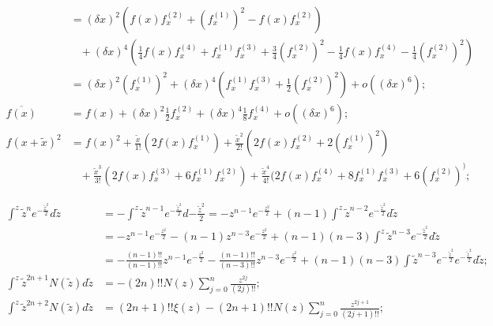 \documentclass[twoside]{article}
\numberwithin{equation}{section}
\newcommand{\eqspace}{\;\;\;}
\begin{document}
\begin{align*}
  &= (\delta x)^2 (f(x) f^{(2)}_x + (f^{(1)}_x)^2 - f(x) f^{(2)}_x) \\
  &\eqspace + (\delta x)^4 (\frac{1}{4} f(x) f^{(4)}_x + f^{(1)}_x f^{(3)}_x + \frac{3}{4} (f^{(2)}_x)^2 - \frac{1}{4} f(x) f^{(4)}_x - \frac{1}{4} (f^{(2)}_x)^2)    \\
  & = (\delta x)^2 (f^{(1)}_x)^2 + (\delta x)^4 (f^{(1)}_x f^{(3)}_x + \frac{1}{2} (f^{(2)}_x)^2) + o((\delta x)^6);  \\
\overline{f(x)} &= f(x) + (\delta x)^2 \frac{1}{2} f^{(2)}_x + (\delta x)^4 \frac{1}{8} f^{(4)}_x + o((\delta x)^6); \\
f(x + \tilde{x})^2 &= f(x)^2 + \frac{\tilde{x}}{1!} (2 f(x) f^{(1)}_x) + \frac{\tilde{x}^2}{2!} (2 f(x) f^{(2)}_x + 2 (f^{(1)}_x)^2) \\
&\eqspace + \frac{\tilde{x}^3}{3!} (2 f(x) f^{(3)}_x + 6 f^{(1)}_x f^{(2)}_x) 
     + \frac{\tilde{x}^4}{4!} (2 f(x) f^{(4)}_x + 8 f^{(1)}_x f^{(3)}_x + 6 (f^{(2)}_x)^);
\end{align*}


\begin{align*}
\int^z \tilde{z}^{n} e^{-\frac{\tilde{z}^2}{2}} d \tilde{z} &= -\int^z \tilde{z}^{n - 1} e^{-\frac{\tilde{z}^2}{2}} d {-\frac{\tilde{z}^2}{2}}
  = - z^{n-1} e^{-\frac{z^2}{2}} + (n-1) \int^z \tilde{z}^{n-2} e^{-\frac{\tilde{z}^2}{2}} d \tilde{z} \\
 &= - z^{n-1} e^{-\frac{z^2}{2}} - (n-1) z^{n-3} e^{-\frac{z^2}{2}} 
  + (n-1) (n-3) \int^z \tilde{z}^{n -3} e^{-\frac{\tilde{z}^2}{2}} d \tilde{z} \\
 &= - \frac{(n-1)!!}{(n-1)!!} z^{n-1} e^{-\frac{z^2}{2}} - \frac{(n-1)!!}{(n-3)!!} z^{n-3} e^{-\frac{z^2}{2}} 
  + (n-1) (n-3) \int \tilde{z}^{n -3} e^{-\frac{\tilde{z}^2}{2}} e^{-\frac{\tilde{z}^2}{2}} d \tilde{z}; \\
\int^z \tilde{z}^{2n + 1} N(\tilde{z}) d \tilde{z} &= - (2n)!! N(z) \sum_{j=0}^{n} \frac{z^{2j}}{(2j)!!}; \\
\int^z \tilde{z}^{2n + 2} N(\tilde{z}) d \tilde{z} &= (2n + 1)!! \xi(z) - (2n + 1)!! N(z) \sum_{j=0}^{n} \frac{z^{2j + 1}}{(2j + 1)!!};
\end{align*}
\end{document}
